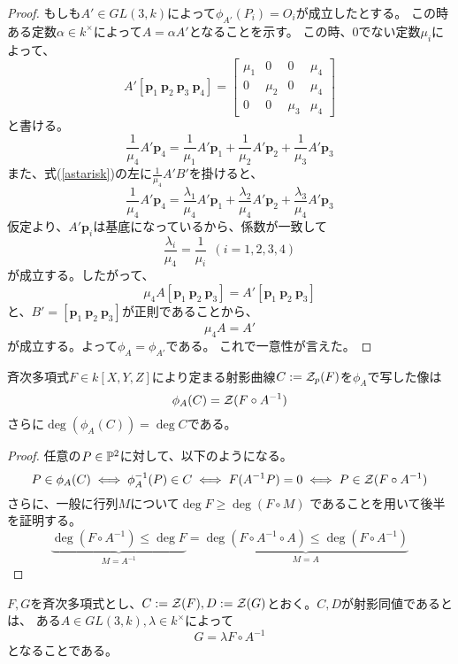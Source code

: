 \documentclass[a4paper]{jsarticle}
\begin{document}
\begin{proof}
    もしも$A' \in GL(3,k)$によって$\phi_{A'}(P_i)=O_i$が成立したとする。
    この時ある定数$\alpha \in k^{\times}$によって$A=\alpha A'$となることを示す。
    この時、0でない定数$\mu_i$によって、
    \[
        A'[\mathbf{p}_1~\mathbf{p}_2~\mathbf{p}_3~\mathbf{p}_4]
        =
        \begin{bmatrix}
            \mu_1& 0& 0& \mu_4 \\
            0& \mu_2& 0& \mu_4 \\
            0& 0& \mu_3& \mu_4
        \end{bmatrix}
    \]
    と書ける。
    \[ \frac{1}{\mu_4}A'\mathbf{p}_4=\frac{1}{\mu_1}A'\mathbf{p}_1+\frac{1}{\mu_2}A'\mathbf{p}_2+\frac{1}{\mu_3}A'\mathbf{p}_3 \]
    また、式(\ref{astarisk})の左に$\frac{1}{\mu_4} A'B'$を掛けると、
    \[ \frac{1}{\mu_4}A'\mathbf{p}_4=\frac{\lambda_1}{\mu_4}A'\mathbf{p}_1+\frac{\lambda_2}{\mu_4}A'\mathbf{p}_2+\frac{\lambda_3}{\mu_4}A'\mathbf{p}_3 \]
    仮定より、$A'\mathbf{p}_i$は基底になっているから、係数が一致して
    \[ \frac{\lambda_i}{\mu_4}=\frac{1}{\mu_i} ~~(i=1,2,3,4) \]
    が成立する。したがって、
    \[ \mu_4 A [\mathbf{p}_1~\mathbf{p}_2~\mathbf{p}_3]=A'[\mathbf{p}_1~\mathbf{p}_2~\mathbf{p}_3] \]
    と、$B'=[\mathbf{p}_1~\mathbf{p}_2~\mathbf{p}_3]$が正則であることから、
    \[ \mu_4 A=A' \]
    が成立する。よって$\phi_A=\phi_{A'}$である。
    これで一意性が言えた。
    
\end{proof}

\begin{Lemma}
    斉次多項式$F \in k[X, Y, Z]$により定まる射影曲線$C:=\mathcal{Z}_p(F)$を$\phi_A$で写した像は
    \[\phi_A(C)=\mathcal{Z}(F \circ A^{-1}) \]
    さらに$\deg(\phi_A(C))=\deg C$である。
\end{Lemma}
\begin{proof}
    任意の$P \in \mathbb{P}^2$に対して、以下のようになる。
    \[ P \in \phi_A(C) \iff \phi^{-1}_A(P) \in C \iff F(A^{-1} P)=0 \iff P \in \mathcal{Z}(F \circ A^{-1}) \]
    さらに、一般に行列$M$について$\deg F \geq \deg (F \circ M)$
    であることを用いて後半を証明する。
    \[
        \underbrace{\deg (F \circ A^{-1}) \leq \deg F}_{M=A^{-1}}
        =
        \underbrace{\deg (F \circ A^{-1} \circ A) \leq \deg(F \circ A^{-1})}_{M=A}
    \]
    
\end{proof}

\begin{Def}
    $F, G$を斉次多項式とし、$C:=\mathcal{Z}(F), D:=\mathcal{Z}(G)$とおく。$C,D$が射影同値であるとは、
    ある$A \in GL(3,k), \lambda \in k^{\times}$によって
    \[ G=\lambda F \circ A^{-1} \]
    となることである。
\end{Def}
\end{document}
